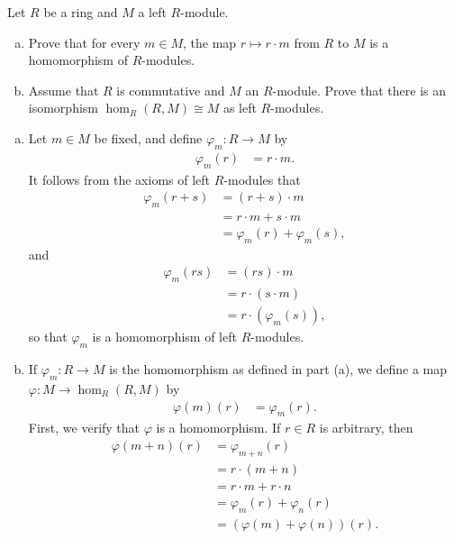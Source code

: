 \documentclass[10pt]{mypackage}
\begin{document}
\RaggedRight
\begin{problem}[Problem 1]
  Let $R$ be a ring and $M$ a left $R$-module.
  \begin{enumerate}[(a)]
    \item Prove that for every $m\in M$, the map $r\mapsto r\cdot m$ from $R$ to $M$ is a homomorphism of $R$-modules.
    \item Assume that $R$ is commutative and $M$ an $R$-module. Prove that there is an isomorphism $\hom_{R}\left( R,M \right)\cong M$ as left $R$-modules.
  \end{enumerate}
\end{problem}
\begin{solution}\hfill
  \begin{enumerate}[(a)]
    \item Let $m\in M$ be fixed, and define $\varphi_m\colon R\rightarrow M$ by
      \begin{align*}
        \varphi_m(r) &= r\cdot m.
      \end{align*}
      It follows from the axioms of left $R$-modules that
      \begin{align*}
        \varphi_m\left( r + s \right) &= \left( r+s \right)\cdot m\\
                                      &= r\cdot m + s\cdot m\\
                                      &= \varphi_m(r) + \varphi_m(s),
      \end{align*}
      and
      \begin{align*}
        \varphi_m\left( rs \right) &= \left( rs \right)\cdot m\\
                                   &= r\cdot \left( s\cdot m \right)\\
                                   &= r\cdot\left( \varphi_m(s) \right),
      \end{align*}
      so that $\varphi_m$ is a homomorphism of left $R$-modules.
    \item If $\varphi_m\colon R\rightarrow M$ is the homomorphism as defined in part (a), we define a map $\varphi\colon M\rightarrow \hom_{R}\left( R,M \right)$ by
      \begin{align*}
        \varphi(m)(r) &= \varphi_m(r).
      \end{align*}
      First, we verify that $\varphi$ is a homomorphism. If $r\in R$ is arbitrary, then
      \begin{align*}
        \varphi\left( m + n \right)\left( r \right) &= \varphi_{m+n}\left( r \right)\\
                                                    &= r\cdot\left( m + n \right)\\
                                                    &= r\cdot m + r\cdot n\\
                                                    &= \varphi_m\left( r \right) + \varphi_n\left( r \right)\\
                                                    &= \left( \varphi(m) + \varphi(n) \right)(r).
      \end{align*}


\end{enumerate}
\end{solution}
\end{document}
